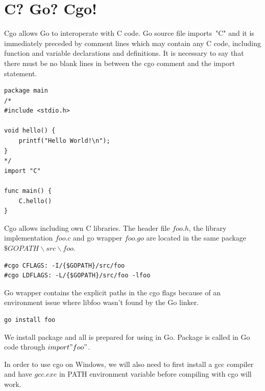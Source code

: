\documentclass[
  digital, %
  notable,   %
  lof,     %
  lot,     %
]{fithesis3}
\begin{document}
\section{C? Go? Cgo!}
Cgo allows Go to interoperate with C code. Go source file imports~"C" and it is immediately 
preceded by comment lines which may contain any C code, including function and variable 
declarations and definitions. It is necessary to say that there must be no blank lines in 
between the cgo comment and the import statement. 

\begin{lstlisting}
package main
/*
#include <stdio.h>

void hello() {
	printf("Hello World!\n");
}
*/
import "C"

func main() {
	C.hello()
}
\end{lstlisting}

Cgo allows including own C libraries. The header file $foo.h$, the library implementation 
$foo.c$ and go wrapper $foo.go$ are located in the same package $\$GOPATH\backslash 
src\backslash foo$. 
\begin{lstlisting}
#cgo CFLAGS: -I/{$GOPATH}/src/foo
#cgo LDFLAGS: -L/{$GOPATH}/src/foo -lfoo
\end{lstlisting}
Go wrapper contains the explicit paths in the cgo flags because of an environment issue where 
libfoo wasn’t found by the Go linker.
\begin{lstlisting} 
go install foo 
\end{lstlisting}
We install package and all is prepared for using in Go. Package is called in Go code through 
$import "foo"$.

In order to use cgo on Windows, we will also need to first install a gcc compiler and have 
$gcc.exe$ in PATH environment variable before compiling with cgo will work.
\end{document}

